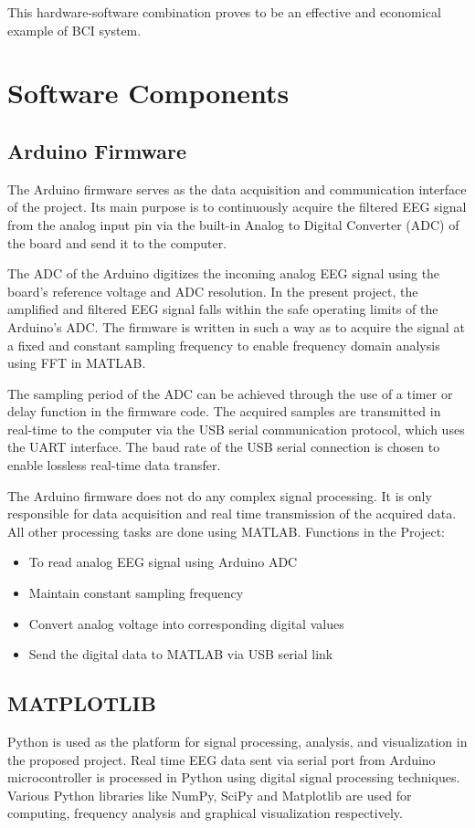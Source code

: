This hardware-software combination proves to be an effective and economical example of BCI system.

\section{Software Components}
\subsection{Arduino Firmware}
The Arduino firmware serves as the data acquisition and communication interface of the project. Its main purpose is to continuously acquire the filtered EEG signal from the analog input pin via the built-in Analog to Digital Converter (ADC) of the board and send it to the computer.

The ADC of the Arduino digitizes the incoming analog EEG signal using the board's reference voltage and ADC resolution. In the present project, the amplified and filtered EEG signal falls within the safe operating limits of the Arduino's ADC. The firmware is written in such a way as to acquire the signal at a fixed and constant sampling frequency to enable frequency domain analysis using FFT in MATLAB.

The sampling period of the ADC can be achieved through the use of a timer or delay function in the firmware code. The acquired samples are transmitted in real-time to the computer via the USB serial communication protocol, which uses the UART interface. The baud rate of the USB serial connection is chosen to enable lossless real-time data transfer.

The Arduino firmware does not do any complex signal processing. It is only responsible for data acquisition and real time transmission of the acquired data. All other processing tasks are done using MATLAB.
Functions in the Project:
\begin{itemize}
	\item To read analog EEG signal using Arduino ADC
	\item Maintain constant sampling frequency
	\item Convert analog voltage into corresponding digital values
	\item Send the digital data to MATLAB via USB serial link
\end{itemize}


\subsection{MATPLOTLIB}
Python is used as the platform for signal processing, analysis, and visualization in the proposed project. Real time EEG data sent via serial port from Arduino microcontroller is processed in Python using digital signal processing techniques. Various Python libraries like NumPy, SciPy and Matplotlib are used for computing, frequency analysis and graphical visualization respectively.

